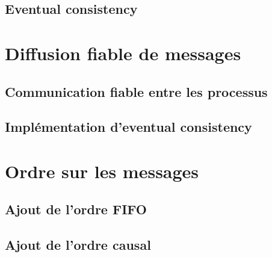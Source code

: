 \documentclass[9pt, handout]{beamer}
\begin{document}
\subsection{Eventual consistency}




 
\section{Diffusion fiable de messages}
 
\subsection{Communication fiable entre les processus}




 
\subsection{Implémentation d'eventual consistency}





 
\section{Ordre sur les messages}
 
\subsection{Ajout de l'ordre FIFO}



 
\subsection{Ajout de l'ordre causal}




 
\end{document}
